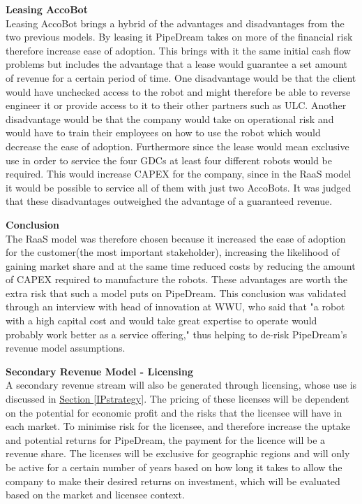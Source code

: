 \documentclass[11pt]{article}		%
\newcommand{\sectref}[1]{\hyperref[#1]{Section \ref*{#1}}}     %
\begin{document}
            \textbf{Leasing AccoBot}
            \\
           Leasing AccoBot brings a hybrid of the advantages and disadvantages from the two previous models. By leasing it PipeDream takes on more of the financial risk therefore increase ease of adoption. This brings with it the same initial cash flow problems but includes the advantage that a lease would guarantee a set amount of revenue for a certain period of time. One disadvantage would be that the client would have unchecked access to the robot and might therefore be able to reverse engineer it or provide access to it to their other partners such as ULC. Another disadvantage would be that the company would take on operational risk and would have to train their employees on how to use the robot which would decrease the ease of adoption. Furthermore since the lease would mean exclusive use in order to service the four GDCs at least four different robots would be required. This would increase CAPEX for the company, since in the RaaS model it would be possible to service all of them with just two AccoBots. It was judged that these  disadvantages outweighed the advantage of a guaranteed revenue.
           
            \textbf{Conclusion}
            \\
           The RaaS model was therefore chosen because it increased the ease of adoption for the customer(the most important stakeholder), increasing the likelihood of gaining market share and at the same time reduced costs by reducing the amount of CAPEX required to manufacture the robots. These advantages are worth the extra risk that such a model puts on PipeDream. This conclusion was validated through an interview with head of innovation at WWU, who said that "a robot with a high capital cost and would take great expertise to operate would probably work better as a service offering," thus helping to de-risk PipeDream's revenue model assumptions.
           
           \textbf{Secondary Revenue Model - Licensing}
           \\
           A secondary revenue stream will also be generated through licensing, whose use is discussed in \sectref{IPstrategy}. 
           The pricing of these licenses will be dependent on the potential for economic profit and the risks that the licensee will have in each market. %
           To minimise risk for the licensee, and therefore increase the uptake and potential returns for PipeDream, the payment for the licence will be a revenue share. The licenses will be exclusive for geographic regions and will only be active for a certain number of years based on how long it takes to allow the company to make their desired returns on investment, which will be evaluated based on the market and licensee context.
            
\end{document}
